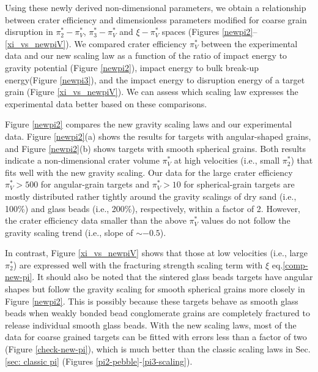 \documentclass[3p,authoryear]{elsarticle}
\begin{document}
Using these newly derived non-dimensional parameters, we obtain a relationship between crater efficiency and dimensionless parameters modified for coarse grain disruption in $\pi_2^*-\pi_V^*$, $\pi_3^*-\pi_V^*$ and $\xi - \pi_V^*$ spaces (Figures \ref{newpi2}--\ref{xi_vs_newpiV}). We compared crater efficiency $\pi_V^*$ between the experimental data and our new scaling law as a function of the ratio of impact energy to gravity potential (Figure \ref{newpi2}), impact energy to bulk break-up energy(Figure \ref{newpi3}), and the impact energy to disruption energy of a target grain (Figure \ref{xi_vs_newpiV}). We can assess which scaling law expresses the experimental data better based on these comparisons.

Figure \ref{newpi2} compares the new gravity scaling laws and our experimental data. Figure \ref{newpi2}(a) shows the results for targets with angular-shaped grains, and Figure \ref{newpi2}(b) shows targets with smooth spherical grains. Both results indicate a non-dimensional crater volume $\pi_V^*$ at high velocities (i.e., small $\pi_2^*$) that fits well with the new gravity scaling. Our data for the large crater efficiency $\pi_V^*> 500$ for angular-grain targets and $\pi_V^*>10$ for spherical-grain targets are mostly distributed rather tightly around the gravity scalings of dry sand (i.e., 100\%) and glass beads (i.e., 200\%), respectively, within a factor of 2. However, the crater efficiency data smaller than the above $\pi_V^*$ values do not follow the gravity scaling trend (i.e., slope of $\sim -0.5$).

In contrast, Figure \ref{xi_vs_newpiV} shows that those at low velocities (i.e., large $\pi_2^*$) are expressed well with the fracturing strength scaling term with $\xi$ eq.\eqref{comp-new-pi}. It should also be noted that the sintered glass beads targets have angular shapes but follow the gravity scaling for smooth spherical grains more closely in Figure \ref{newpi2}. This is possibly because these targets behave as smooth glass beads when weakly bonded bead conglomerate grains are completely fractured to release individual smooth glass beads. With the new scaling laws, most of the data for coarse grained targets can be fitted with errors less than a factor of two (Figure \ref{check-new-pi}), which is much better than the classic scaling laws in Sec. \ref{sec: classic pi} (Figures \ref{pi2-pebble}-\ref{pi3-scaling}).
\end{document}
